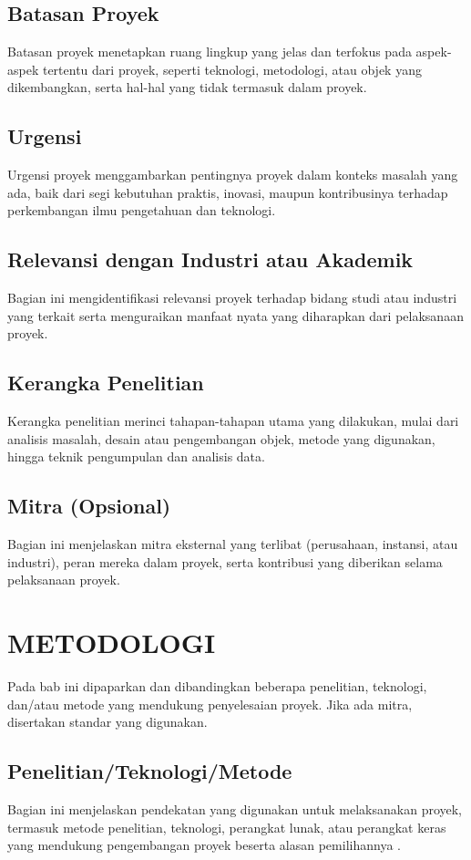 \documentclass[proyek,laporan]{itkta2025}
\begin{document}
\section{Batasan Proyek}
Batasan proyek menetapkan ruang lingkup yang jelas dan terfokus pada aspek-aspek tertentu dari proyek, seperti teknologi, metodologi, atau objek yang dikembangkan, serta hal-hal yang tidak termasuk dalam proyek.

\section{Urgensi}
Urgensi proyek menggambarkan pentingnya proyek dalam konteks masalah yang ada, baik dari segi kebutuhan praktis, inovasi, maupun kontribusinya terhadap perkembangan ilmu pengetahuan dan teknologi.

\section{Relevansi dengan Industri atau Akademik}
Bagian ini mengidentifikasi relevansi proyek terhadap bidang studi atau industri yang terkait serta menguraikan manfaat nyata yang diharapkan dari pelaksanaan proyek.

\section{Kerangka Penelitian}
Kerangka penelitian merinci tahapan-tahapan utama yang dilakukan, mulai dari analisis masalah, desain atau pengembangan objek, metode yang digunakan, hingga teknik pengumpulan dan analisis data.

\section{Mitra (Opsional)}
Bagian ini menjelaskan mitra eksternal yang terlibat (perusahaan, instansi, atau industri), peran mereka dalam proyek, serta kontribusi yang diberikan selama pelaksanaan proyek.

\chapter{METODOLOGI}
Pada bab ini dipaparkan dan dibandingkan beberapa penelitian, teknologi, dan/atau metode yang mendukung penyelesaian proyek. Jika ada mitra, disertakan standar yang digunakan.

\section{Penelitian/Teknologi/Metode}
Bagian ini menjelaskan pendekatan yang digunakan untuk melaksanakan proyek, termasuk metode penelitian, teknologi, perangkat lunak, atau perangkat keras yang mendukung pengembangan proyek beserta alasan pemilihannya \citep{santiago2023}.
\end{document}
